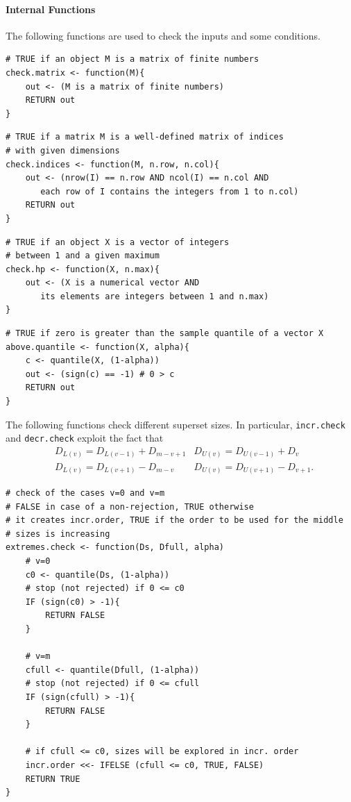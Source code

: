 \documentclass[11pt,a4paper,openright,twoside]{article}
\begin{document}

\vspace{3mm}
\paragraph{Internal Functions}
The following functions are used to check the inputs and some conditions.
\begin{lstlisting}
# TRUE if an object M is a matrix of finite numbers
check.matrix <- function(M){
	out <- (M is a matrix of finite numbers)
	RETURN out
}
\end{lstlisting}

\begin{lstlisting}
# TRUE if a matrix M is a well-defined matrix of indices
# with given dimensions
check.indices <- function(M, n.row, n.col){
	out <- (nrow(I) == n.row AND ncol(I) == n.col AND
	   each row of I contains the integers from 1 to n.col)
	RETURN out
}
\end{lstlisting}

\begin{lstlisting}
# TRUE if an object X is a vector of integers
# between 1 and a given maximum
check.hp <- function(X, n.max){
	out <- (X is a numerical vector AND
	   its elements are integers between 1 and n.max)
}
\end{lstlisting}

\begin{lstlisting}
# TRUE if zero is greater than the sample quantile of a vector X
above.quantile <- function(X, alpha){
	c <- quantile(X, (1-alpha))
	out <- (sign(c) == -1) # 0 > c
	RETURN out
}
\end{lstlisting}




\vspace{3mm}
The following functions check different superset sizes. In particular, \texttt{incr.check} and \texttt{decr.check} exploit the fact that
\begin{align*}
&D_{L(v)}=D_{L(v-1)}+D_{m-v+1} & D_{U(v)}=D_{U(v-1)}+D_{v}\\
&D_{L(v)}=D_{L(v+1)}-D_{m-v} & D_{U(v)}=D_{U(v+1)}-D_{v+1}.
\end{align*}

\begin{lstlisting}
# check of the cases v=0 and v=m
# FALSE in case of a non-rejection, TRUE otherwise
# it creates incr.order, TRUE if the order to be used for the middle
# sizes is increasing
extremes.check <- function(Ds, Dfull, alpha)
	# v=0
	c0 <- quantile(Ds, (1-alpha))
	# stop (not rejected) if 0 <= c0
	IF (sign(c0) > -1){
		RETURN FALSE
	}

	# v=m
	cfull <- quantile(Dfull, (1-alpha))
	# stop (not rejected) if 0 <= cfull
	IF (sign(cfull) > -1){
		RETURN FALSE
	}

	# if cfull <= c0, sizes will be explored in incr. order
	incr.order <<- IFELSE (cfull <= c0, TRUE, FALSE)
	RETURN TRUE
}\end{lstlisting}
\end{document}
